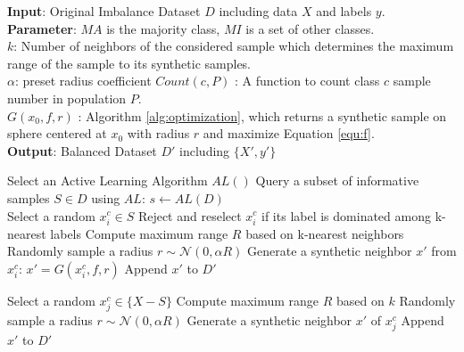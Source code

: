 \begin{algorithm}[ht]
	\caption{\Methodname}
	
	\begin{flushleft}
		\textbf{Input}: Original Imbalance Dataset $D$ including data $X$ and labels $y$.\\
		\textbf{Parameter}: 
		$MA$ is the majority class, $MI$ is a set of other classes.\\
		$k$: Number of  neighbors of the considered sample which determines the maximum range of the sample to its synthetic samples.\\ 
		$\alpha$: preset radius coefficient
		$Count(c, P)$ : A function to count class $c$ sample number in population $P$.\\
		$G(x_0,f,r)$ : Algorithm \ref{alg:optimization}, which returns a synthetic sample on sphere centered at $x_0$ with radius $r$ and maximize Equation \ref{equ:f}.  \\
		\textbf{Output}: Balanced Dataset $D'$ including $\{X',y'\}$
		\begin{algorithmic}[1]
			\STATE Select an Active Learning Algorithm $AL()$
			\STATE Query a subset of informative samples $S \in D$  using $AL$:
			$s  \leftarrow AL(D) $	\\
			
			\STATE Select a random $x_i^c \in S$
			\STATE Reject and reselect $x_i^c$ if its label is dominated among k-nearest labels
			\STATE Compute maximum range $R$ based on k-nearest neighbors
			\STATE Randomly sample a radius $r \sim \mathcal{N}(0,\alpha R)$
			\STATE Generate a synthetic neighbor $x'$ from $x_i^c$:
			$x'=G(x_i^c,f,r)$ 
			\STATE Append $x'$ to $D'$
			\ENDWHILE
			\ENDFOR
			
			\STATE Select a random $x_j^c \in \{X-S\}$
			\STATE Compute maximum range $R$ based on $k$
			\STATE Randomly sample a radius $r \sim \mathcal{N}(0,\alpha R)$
			\STATE Generate a synthetic neighbor $x'$ of $x_j^c$ 
			\STATE Append $x'$ to $D'$
			\ENDWHILE
			\ENDFOR
			\RETURN 
		\end{algorithmic}
	\end{flushleft}
	\label{alg:SIMPOR}
\end{algorithm}